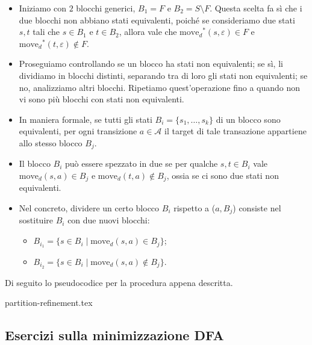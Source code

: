 \documentclass[class=book, crop=false, oneside, 12pt]{standalone}
\begin{document}
\begin{itemize}
    \item Iniziamo con \(2\) blocchi generici, \(B_{1}=F\) e \(B_{2}=S\setminus F\). Questa scelta fa sì che i due blocchi non abbiano stati equivalenti, poiché se consideriamo due stati \(s, t\) tali che \(s\in B_{1}\) e \(t\in B_{2}\), allora vale che \(\textrm{move}_{d}\!^{*}(s,\varepsilon)\in F\) e \(\textrm{move}_{d}\!^{*}(t,\varepsilon)\notin F\).
    \item Proseguiamo controllando se un blocco ha stati non equivalenti; se sì, li dividiamo in blocchi distinti, separando tra di loro gli stati non equivalenti; se no, analizziamo altri blocchi. Ripetiamo quest'operazione fino a quando non vi sono più blocchi con stati non equivalenti.
    \item In maniera formale, se tutti gli stati \(B_{i}=\{s_{1}, \ldots, s_{k}\}\) di un blocco sono equivalenti, per ogni transizione \(a \in \mathcal{A}\) il target di tale transazione appartiene allo stesso blocco \(B_j\).
    \item Il blocco \(B_{i}\) può essere spezzato in due se per qualche \(s,t \in B_{i}\) vale \(\textrm{move}_{d}(s,a)\in B_{j}\) e \(\textrm{move}_{d}(t,a)\notin B_{j}\), ossia se ci sono due stati non equivalenti.
    \item Nel concreto, dividere un certo blocco \(B_{i}\) rispetto a (\(a,B_{j}\)) consiste nel sostituire \(B_{i}\) con due nuovi blocchi:
    \begin{itemize}
        \item \( B_{i_1} = \{s \in B_{i} \mid \textrm{move}_{d}(s,a)\in B_j\}\);
        \item \( B_{i_2} = \{s \in B_{i} \mid \textrm{move}_{d}(s,a)\notin B_j\}\).
    \end{itemize}
\end{itemize}
Di seguito lo pseudocodice per la procedura appena descritta.

{partition-refinement.tex}

\subsection{Esercizi sulla minimizzazione DFA}
\end{document}
